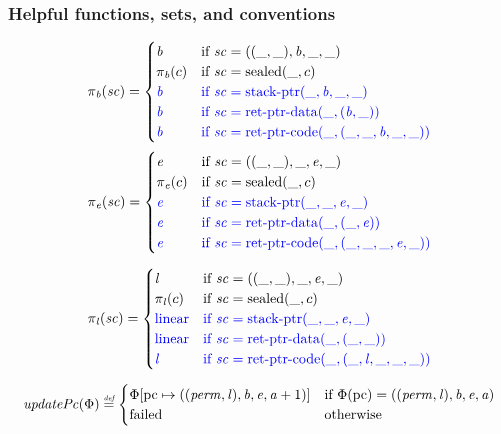 \documentclass[a4paper]{article}
\begin{document}
\subsubsection{Helpful functions, sets, and conventions}

\[
  \pi_{\mathit{b}}(\mathit{sc}) =
  \begin{cases}
    \mathit{b} & \text{if $\mathit{sc} = ((\_,\_),\mathit{b},\_,\_)$} \\ 
    \pi_{\mathit{b}}(c) & \text{if $\mathit{sc} = \mathrm{sealed}(\_,c)$} \\ 
    {\color{blue} \mathit{b}} & {\color{blue} \text{if $\mathit{sc} = \mathrm{stack\text{-}ptr}(\_,\mathit{b},\_,\_)$}} \\ 
    {\color{blue} \mathit{b}} & {\color{blue} \text{if $\mathit{sc} = \mathrm{ret\text{-}ptr\text{-}data}(\_,(\mathit{b},\_))$}} \\ 
    {\color{blue} \mathit{b}} & {\color{blue} \text{if $\mathit{sc} = \mathrm{ret\text{-}ptr\text{-}code}(\_,(\_,\_,\mathit{b},\_,\_))$}}
  \end{cases}
\]
\[
  \pi_{\mathit{e}}(\mathit{sc}) =
  \begin{cases}
    \mathit{e} & \text{if $\mathit{sc} = ((\_,\_),\_,\mathit{e},\_)$} \\ 
    \pi_{\mathit{e}}(c) & \text{if $\mathit{sc} = \mathrm{sealed}(\_,c)$} \\ 
    {\color{blue} \mathit{e}} & {\color{blue} \text{if $\mathit{sc} = \mathrm{stack\text{-}ptr}(\_,\_,\mathit{e},\_)$}} \\ 
    {\color{blue} \mathit{e}} & {\color{blue} \text{if $\mathit{sc} = \mathrm{ret\text{-}ptr\text{-}data}(\_,(\_,\mathit{e}))$}} \\ 
    {\color{blue} \mathit{e}} & {\color{blue} \text{if $\mathit{sc} = \mathrm{ret\text{-}ptr\text{-}code}(\_,(\_,\_,\_,\mathit{e},\_))$}}
  \end{cases}
\]

\[
  \pi_{\mathit{l}}(\mathit{sc}) = 
  \begin{cases}
    \mathit{l} & \text{if $\mathit{sc} = ((\_,\_),\_,\mathit{e},\_)$} \\ 
    \pi_{\mathit{l}}(c) & \text{if $\mathit{sc} = \mathrm{sealed}(\_,c)$} \\ 
    {\color{blue} \mathrm{linear}} & {\color{blue} \text{if $\mathit{sc} = \mathrm{stack\text{-}ptr}(\_,\_,\mathit{e},\_)$}} \\ 
    {\color{blue} \mathrm{linear}} & {\color{blue} \text{if $\mathit{sc} = \mathrm{ret\text{-}ptr\text{-}data}(\_,(\_,\_))$}} \\ 
    {\color{blue} \mathit{l}} & {\color{blue} \text{if $\mathit{sc} = \mathrm{ret\text{-}ptr\text{-}code}(\_,(\_,\mathit{l},\_,\_,\_))$}}
  \end{cases}
\]

\[
  \updPcAddr{\Phi} \defeq 
  \begin{cases}
    \Phi\update{\pcreg}{((\perm,\lin),\baddr,\eaddr,\aaddr+1)} & \text{if $\Phi(\pcreg) = ((\perm,\lin),\baddr,\eaddr,\aaddr)$}\\
    \failed & \totherwise
  \end{cases}
\]
\end{document}
